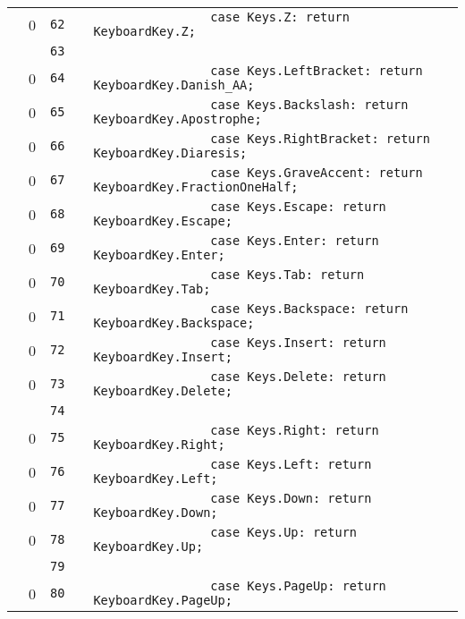 \documentclass[a4paper,landscape,10pt]{article}
\begin{document}
\begin{longtable}[l]{lrrll}
\cellcolor{red} & 0 & \verb~62~ & & \verb~                case Keys.Z: return KeyboardKey.Z;~\\
\cellcolor{gray} &  & \verb~63~ & & \verb~~\\
\cellcolor{red} & 0 & \verb~64~ & & \verb~                case Keys.LeftBracket: return KeyboardKey.Danish_AA;~\\
\cellcolor{red} & 0 & \verb~65~ & & \verb~                case Keys.Backslash: return KeyboardKey.Apostrophe;~\\
\cellcolor{red} & 0 & \verb~66~ & & \verb~                case Keys.RightBracket: return KeyboardKey.Diaresis;~\\
\cellcolor{red} & 0 & \verb~67~ & & \verb~                case Keys.GraveAccent: return KeyboardKey.FractionOneHalf;~\\
\cellcolor{red} & 0 & \verb~68~ & & \verb~                case Keys.Escape: return KeyboardKey.Escape;~\\
\cellcolor{red} & 0 & \verb~69~ & & \verb~                case Keys.Enter: return KeyboardKey.Enter;~\\
\cellcolor{red} & 0 & \verb~70~ & & \verb~                case Keys.Tab: return KeyboardKey.Tab;~\\
\cellcolor{red} & 0 & \verb~71~ & & \verb~                case Keys.Backspace: return KeyboardKey.Backspace;~\\
\cellcolor{red} & 0 & \verb~72~ & & \verb~                case Keys.Insert: return KeyboardKey.Insert;~\\
\cellcolor{red} & 0 & \verb~73~ & & \verb~                case Keys.Delete: return KeyboardKey.Delete;~\\
\cellcolor{gray} &  & \verb~74~ & & \verb~~\\
\cellcolor{red} & 0 & \verb~75~ & & \verb~                case Keys.Right: return KeyboardKey.Right;~\\
\cellcolor{red} & 0 & \verb~76~ & & \verb~                case Keys.Left: return KeyboardKey.Left;~\\
\cellcolor{red} & 0 & \verb~77~ & & \verb~                case Keys.Down: return KeyboardKey.Down;~\\
\cellcolor{red} & 0 & \verb~78~ & & \verb~                case Keys.Up: return KeyboardKey.Up;~\\
\cellcolor{gray} &  & \verb~79~ & & \verb~~\\
\cellcolor{red} & 0 & \verb~80~ & & \verb~                case Keys.PageUp: return KeyboardKey.PageUp;~\\

\end{longtable}
\end{document}

